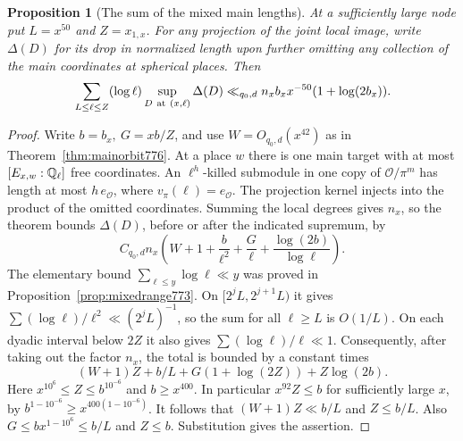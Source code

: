 \documentclass[a4paper,11pt]{article}
\newtheorem{proposition}{Proposition}[section]
\theoremstyle{definition}
\theoremstyle{remark}
\numberwithin{equation}{section}
\begin{document}
\begin{proposition}[The sum of the mixed main lengths]
\leavevmode\label{prop:sumallmixed777}
At a sufficiently large node put \(L=x^{50}\) and
\(Z=x_{1,x}\). For any projection of the joint local
image, write \(\Delta(D)\) for its drop in normalized
length upon further omitting any collection of the main
coordinates at spherical places. Then
\[
 \sum_{L\le\ell\le Z}(\log\ell)
     \sup_{D\ {\rm at}\ (x,\ell)}\Delta(D)
   \ll_{q_0,d} n_x b_x x^{-50}(1+\log(2b_x)).
\]
\end{proposition}
\begin{proof}
Write \(b=b_x,\ G=xb/Z\), and use \(W=O_{q_0,d}(x^{42})\)
as in Theorem~\ref{thm:mainorbit776}. At a place \(w\)
there is one main target with at most
\([E_{x,w}:\mathbb Q_\ell]\) free coordinates. An \(\ell^h\)-killed
submodule in one copy of \(\mathcal O/\pi^m\) has length
at most \(h\,e_{\mathcal O}\), where \(v_\pi(\ell)=e_{\mathcal O}\).
The projection kernel injects into the product of the
omitted coordinates. Summing the local degrees gives
\(n_x\), so the theorem bounds \(\Delta(D)\), before or
after the indicated supremum, by
\[
 C_{q_0,d} n_x
 \left(W+1+\frac{b}{\ell^2}+\frac{G}{\ell}
                         +\frac{\log(2b)}{\log\ell}\right).
\]
The elementary bound \(\sum_{\ell\le y}\log\ell\ll y\)
was proved in Proposition~\ref{prop:mixedrange773}. On
\([2^j L,2^{j+1}L)\) it gives
\(\sum(\log\ell)/\ell^2\ll (2^jL)^{-1}\), so the sum
for all \(\ell\ge L\) is \(O(1/L)\). On each dyadic
interval below \(2Z\) it also gives
\(\sum(\log\ell)/\ell\ll1\). Consequently, after taking
out the factor \(n_x\), the total is bounded by a constant
times
\[
          (W+1)Z+b/L+G(1+\log(2Z))+Z\log(2b).
\]
Here \(x^{10^6}\le Z\le b^{10^{-6}}\) and \(b\ge x^{400}\).
In particular \(x^{92}Z\le b\) for sufficiently large
\(x\), by \(b^{1-10^{-6}}\ge x^{400(1-10^{-6})}\).
It follows that \((W+1)Z\ll b/L\) and \(Z\le b/L\).
Also \(G\le b x^{1-10^6}\le b/L\) and \(Z\le b\).
Substitution gives the assertion.
\end{proof}
\end{document}
